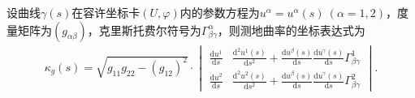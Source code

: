 \documentclass[../../main.tex]{subfiles}%
\begin{document}
\begin{proposition}
设曲线$\gamma(s)$在容许坐标卡$(U,\varphi)$内的参数方程为$u^\alpha=u^\alpha(s)\ (\alpha=1,2)$，度量矩阵为$(g_{\alpha\beta})$，克里斯托费尔符号为$\Gamma^\alpha_{\beta\gamma}$，则测地曲率的坐标表达式为
\begin{align}
\kappa_g(s)=\sqrt{g_{11}g_{22}-(g_{12})^2}\cdot
\begin{vmatrix}
\frac{\mathrm{d}u^1}{\mathrm{d}s} & \frac{\mathrm{d}^2u^1(s)}{\mathrm{d}s^2}+\frac{\mathrm{d}u^\beta(s)}{\mathrm{d}s}\frac{\mathrm{d}u^\gamma(s)}{\mathrm{d}s}\Gamma^1_{\beta\gamma} \\
\frac{\mathrm{d}u^2}{\mathrm{d}s} & \frac{\mathrm{d}^2u^2(s)}{\mathrm{d}s^2}+\frac{\mathrm{d}u^\beta(s)}{\mathrm{d}s}\frac{\mathrm{d}u^\gamma(s)}{\mathrm{d}s}\Gamma^2_{\beta\gamma}
\end{vmatrix}.\label{eq:7.19}
\end{align}
\end{proposition}
\end{document}

